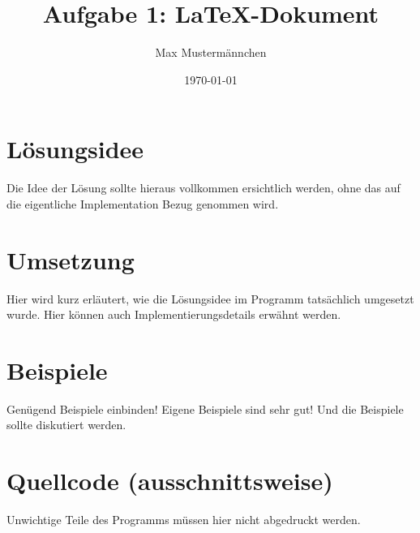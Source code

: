 \documentclass[a4paper,10pt]{scrartcl}
\title{Aufgabe 1: \LaTeX-Dokument}
\author{Max Mustermännchen}
\date{\today}
\begin{document}
\maketitle

\section{Lösungsidee}
Die Idee der Lösung sollte hieraus vollkommen ersichtlich werden, ohne das auf die eigentliche Implementation Bezug genommen wird.

\section{Umsetzung}
Hier wird kurz erläutert, wie die Lösungsidee im Programm tatsächlich umgesetzt wurde. Hier können auch Implementierungsdetails erwähnt werden.

\section{Beispiele}
Genügend Beispiele einbinden! Eigene Beispiele sind sehr gut! Und die Beispiele sollte diskutiert werden.

\section{Quellcode (ausschnittsweise)}
Unwichtige Teile des Programms müssen hier nicht abgedruckt werden.
\end{document}
